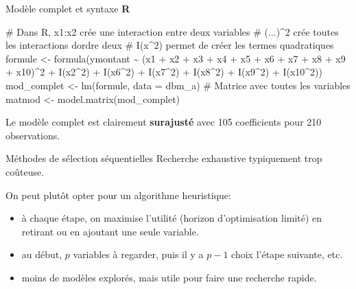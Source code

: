 \documentclass[
  ignorenonframetext,
]{beamer}
\newenvironment{Shaded}{\begin{snugshade}}{\end{snugshade}}
\newcommand{\AttributeTok}[1]{\textcolor[rgb]{0.40,0.45,0.13}{#1}}
\newcommand{\CommentTok}[1]{\textcolor[rgb]{0.37,0.37,0.37}{#1}}
\newcommand{\DecValTok}[1]{\textcolor[rgb]{0.68,0.00,0.00}{#1}}
\newcommand{\FunctionTok}[1]{\textcolor[rgb]{0.28,0.35,0.67}{#1}}
\newcommand{\NormalTok}[1]{\textcolor[rgb]{0.00,0.23,0.31}{#1}}
\newcommand{\OtherTok}[1]{\textcolor[rgb]{0.00,0.23,0.31}{#1}}
\newcommand{\SpecialCharTok}[1]{\textcolor[rgb]{0.37,0.37,0.37}{#1}}
\providecommand{\tightlist}{%
  \setlength{\itemsep}{0pt}\setlength{\parskip}{0pt}}
\begin{document}
\begin{frame}[fragile]{Modèle complet et syntaxe \textbf{R}}
\protect{}\label{moduxe8le-complet-et-syntaxe-r}
\begin{Shaded}
\begin{Highlighting}[numbers=left,,]
\CommentTok{\# Dans R, x1:x2 crée une interaction entre deux variables}
\CommentTok{\# (...)\^{}2 crée toutes les interactions d\textquotesingle{}ordre deux}
\CommentTok{\# I(x\^{}2) permet de créer les termes quadratiques}
\NormalTok{formule }\OtherTok{\textless{}{-}} 
  \FunctionTok{formula}\NormalTok{(ymontant }\SpecialCharTok{\textasciitilde{}} 
\NormalTok{          (x1 }\SpecialCharTok{+}\NormalTok{ x2 }\SpecialCharTok{+}\NormalTok{ x3 }\SpecialCharTok{+}\NormalTok{ x4 }\SpecialCharTok{+}\NormalTok{ x5 }\SpecialCharTok{+} 
\NormalTok{             x6 }\SpecialCharTok{+}\NormalTok{ x7 }\SpecialCharTok{+}\NormalTok{ x8 }\SpecialCharTok{+}\NormalTok{ x9 }\SpecialCharTok{+}\NormalTok{ x10)}\SpecialCharTok{\^{}}\DecValTok{2} \SpecialCharTok{+} 
            \FunctionTok{I}\NormalTok{(x2}\SpecialCharTok{\^{}}\DecValTok{2}\NormalTok{) }\SpecialCharTok{+} \FunctionTok{I}\NormalTok{(x6}\SpecialCharTok{\^{}}\DecValTok{2}\NormalTok{) }\SpecialCharTok{+} \FunctionTok{I}\NormalTok{(x7}\SpecialCharTok{\^{}}\DecValTok{2}\NormalTok{) }\SpecialCharTok{+}
            \FunctionTok{I}\NormalTok{(x8}\SpecialCharTok{\^{}}\DecValTok{2}\NormalTok{) }\SpecialCharTok{+} \FunctionTok{I}\NormalTok{(x9}\SpecialCharTok{\^{}}\DecValTok{2}\NormalTok{) }\SpecialCharTok{+} \FunctionTok{I}\NormalTok{(x10}\SpecialCharTok{\^{}}\DecValTok{2}\NormalTok{))}
\NormalTok{mod\_complet }\OtherTok{\textless{}{-}} \FunctionTok{lm}\NormalTok{(formule, }\AttributeTok{data =}\NormalTok{ dbm\_a)}
\CommentTok{\# Matrice avec toutes les variables}
\NormalTok{matmod }\OtherTok{\textless{}{-}} \FunctionTok{model.matrix}\NormalTok{(mod\_complet)}
\end{Highlighting}
\end{Shaded}

Le modèle complet est clairement \textbf{surajusté} avec 105
coefficients pour 210 observations.
\end{frame}

\begin{frame}{Méthodes de sélection séquentielles}
\protect{}\label{muxe9thodes-de-suxe9lection-suxe9quentielles}
Recherche exhaustive typiquement trop coûteuse.

On peut plutôt opter pour un algorithme heuristique:

\begin{itemize}
\tightlist
\item
  à chaque étape, on maximise l'utilité (horizon d'optimisation limité)
  en retirant ou en ajoutant une seule variable.
\item
  au début, \(p\) variables à regarder, puis il y a \(p-1\) choix
  l'étape suivante, etc.
\item
  moins de modèles explorés, mais utile pour faire une recherche rapide.
\end{itemize}
\end{frame}
\end{document}
